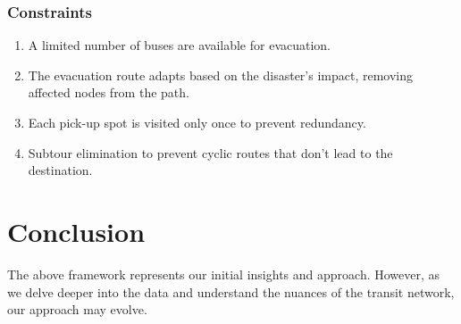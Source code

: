 \documentclass[12pt]{article}
\begin{document}
\subsubsection{Constraints}\label{constraints}
\begin{enumerate}

      \item
            A limited number of buses are available for evacuation.
      \item
            The evacuation route adapts based on the disaster's impact, removing
            affected nodes from the path.
      \item
            Each pick-up spot is visited only once to prevent redundancy.
      \item
            Subtour elimination to prevent cyclic routes that don't lead to the
            destination.
\end{enumerate}

\section{Conclusion}\label{conclusion}

The above framework represents our initial insights and approach.
However, as we delve deeper into the data and understand the nuances of
the transit network, our approach may evolve.
\end{document}
